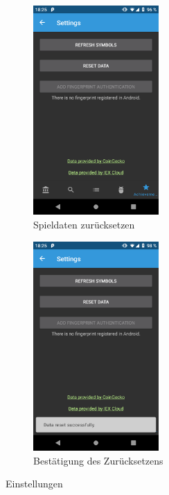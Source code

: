 \documentclass[a4paper]{article}
\begin{document}
\begin{figure}[H]
	\begin{subfigure}{.5\textwidth}
		\centering
		\includegraphics[height=8cm,keepaspectratio]{./images/demo/settings.png}
		\caption{Spieldaten zurücksetzen}
		\label{fig:demo:settings_data_reset}
	\end{subfigure}
	\begin{subfigure}{.5\textwidth}
		\centering
		\includegraphics[height=8cm,keepaspectratio]{./images/demo/settings_data_reset.png}
		\caption{Bestätigung des Zurücksetzens}
		\label{fig:demo:settings_data_reset_confirmation}
	\end{subfigure}
		\caption{Einstellungen}
		\label{fig:demo:settings}
\end{figure}
\end{document}
